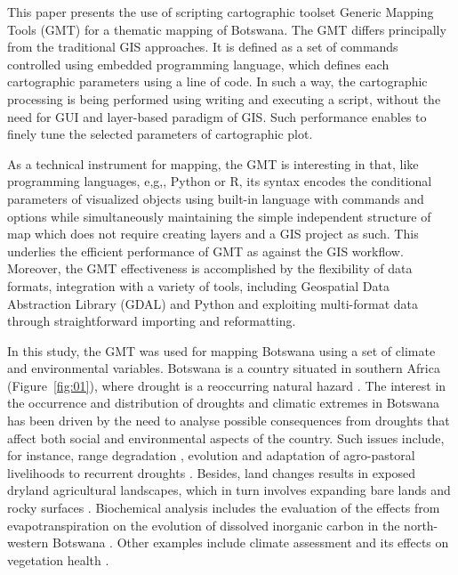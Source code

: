\documentclass[ijgi,article,submit,pdftex,moreauthors]{Definitions/mdpi}
\begin{document}
This paper presents the use of scripting cartographic toolset Generic Mapping Tools (GMT) \cite{Wessel} for a thematic mapping of Botswana. The GMT differs principally from the traditional GIS approaches. It is defined as a set of commands controlled using embedded programming language, which defines each cartographic parameters using a line of code. In such a way, the cartographic processing is being performed using writing and executing a script, without the need for GUI and layer-based paradigm of GIS. Such performance enables to finely tune the selected parameters of cartographic plot. 

As a technical instrument for mapping, the GMT is interesting in that, like programming languages, e,g,, Python or R, its syntax encodes the conditional parameters of visualized objects using built-in language with commands and options while simultaneously maintaining the simple independent structure of map which does not require creating layers and a GIS project as such. This underlies the efficient performance of GMT as against the GIS workflow. Moreover, the GMT effectiveness is accomplished by the flexibility of data formats, integration with a variety of tools, including Geospatial Data Abstraction Library (GDAL) and Python and exploiting multi-format data through straightforward importing and reformatting.

In this study, the GMT was used for mapping Botswana using a set of climate and environmental variables. Botswana is a country situated in southern Africa (Figure~\ref{fig:01}), where drought is a reoccurring natural hazard \cite{Batisani2011}. The interest in the occurrence and distribution of droughts and climatic extremes in Botswana has been driven by the need to analyse possible consequences from droughts that affect both social and environmental aspects of the country. Such issues include, for instance, range degradation \cite{Vanderpost}, evolution and adaptation of agro-pastoral livelihoods to recurrent droughts \cite{Mogotsi}. Besides, land changes  results in exposed dryland agricultural landscapes, which in turn involves expanding bare lands and rocky surfaces \cite{Akinyemi}. Biochemical analysis includes the evaluation of the effects from evapotranspiration on the evolution of dissolved inorganic carbon in the north-western Botswana \cite{Atekwana}. Other examples include climate assessment and its effects on vegetation health \cite{Ringrose2002}. 
\end{document}
